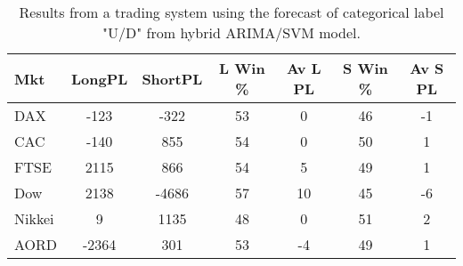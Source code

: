 \begin{table}[ht]
\centering
\caption[Results from a trading system using the forecast of categorical label "U/D" from hybrid ARIMA/SVM model]{Results from a trading system using the forecast of categorical label "U/D" from hybrid ARIMA/SVM model.} 
\label{tab:chp_ts:pUD_CAT_arima_svm_sys}
\begin{tabular}{lcccccc}
  \toprule Mkt & LongPL & ShortPL & L Win \% & Av L PL & S Win \% & Av S PL \\ 
  \midrule DAX & -123 & -322 & 53 & 0 & 46 & -1 \\ 
  CAC & -140 & 855 & 54 & 0 & 50 & 1 \\ 
  FTSE & 2115 & 866 & 54 & 5 & 49 & 1 \\ 
  Dow & 2138 & -4686 & 57 & 10 & 45 & -6 \\ 
  Nikkei & 9 & 1135 & 48 & 0 & 51 & 2 \\ 
  AORD & -2364 & 301 & 53 & -4 & 49 & 1 \\ 
   \bottomrule \end{tabular}
\end{table}
